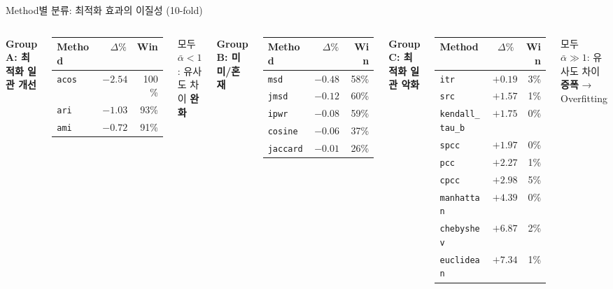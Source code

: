\documentclass[aspectratio=169,10pt]{beamer}
\begin{document}
\begin{frame}[shrink=5]{Method별 분류: 최적화 효과의 이질성 (10-fold)}
	\begin{columns}[T]
			\textbf{\textcolor{testgreen}{Group A}: 최적화 일관 개선}
			\renewcommand{\arraystretch}{1.15}
			\begin{tabular}{l|r|r}
				\toprule
				Method & $\Delta\%$ & Win \\
				\midrule
				\texttt{acos} & $-2.54$ & 100\% \\
				\texttt{ari}  & $-1.03$ & 93\% \\
				\texttt{ami}  & $-0.72$ & 91\% \\
				\bottomrule
			\end{tabular}
			{\scriptsize 모두 $\bar\alpha<1$: 유사도 차이 \textbf{완화}}

			\vspace{0.6em}
			\textbf{\textcolor{posblue}{Group B}: 미미/혼재}
			\renewcommand{\arraystretch}{1.15}
			\begin{tabular}{l|r|r}
				\toprule
				Method & $\Delta\%$ & Win \\
				\midrule
				\texttt{msd}     & $-0.48$ & 58\% \\
				\texttt{jmsd}    & $-0.12$ & 60\% \\
				\texttt{ipwr}    & $-0.08$ & 59\% \\
				\texttt{cosine}  & $-0.06$ & 37\% \\
				\texttt{jaccard} & $-0.01$ & 26\% \\
				\bottomrule
			\end{tabular}

			\textbf{\textcolor{negred}{Group C}: 최적화 일관 악화}
			\renewcommand{\arraystretch}{1.15}
			\begin{tabular}{l|r|r}
				\toprule
				Method & $\Delta\%$ & Win \\
				\midrule
				\texttt{itr}           & $+0.19$ & 3\% \\
				\texttt{src}           & $+1.57$ & 1\% \\
				\texttt{kendall\_tau\_b}& $+1.75$ & 0\% \\
				\texttt{spcc}          & $+1.97$ & 0\% \\
				\texttt{pcc}           & $+2.27$ & 1\% \\
				\texttt{cpcc}          & $+2.98$ & 5\% \\
				\texttt{manhattan}     & $+4.39$ & 0\% \\
				\texttt{chebyshev}     & $+6.87$ & 2\% \\
				\texttt{euclidean}     & $+7.34$ & 1\% \\
				\bottomrule
			\end{tabular}
			{\scriptsize 모두 $\bar\alpha\gg1$: 유사도 차이 \textbf{증폭} → Overfitting}
	\end{columns}
\end{frame}
\end{document}
